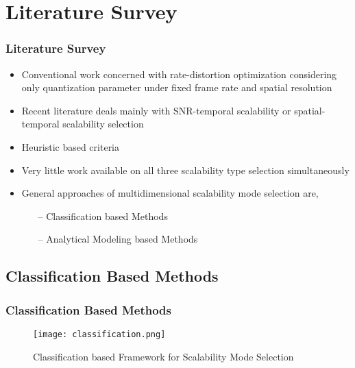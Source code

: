 \documentclass{beamer}
\begin{document}
%


\section{Literature Survey}
\begin{frame}\frametitle{Literature Survey}
\begin{itemize}
\setlength\itemsep{0.8 em}
\item Conventional work concerned with rate-distortion optimization considering only quantization parameter under fixed frame rate and spatial resolution
\item Recent literature deals mainly with SNR-temporal scalability or spatial-temporal scalability selection
\item Heuristic based criteria
\item Very little work available on all three scalability type selection simultaneously
\item General approaches of multidimensional scalability mode selection are,
	\begin{itemize}
	\item[--] Classification based Methods
	\item[--] Analytical Modeling based Methods
	\end{itemize}
\end{itemize}
\end{frame}

\subsection{Classification Based Methods}
\begin{frame}\frametitle{Classification Based Methods}
\begin{figure}
\centering
\texttt{[image: classification.png]}
\caption{Classification based Framework for Scalability Mode Selection }
\label{classification}
\end{figure}
\end{frame} 
\end{document}
